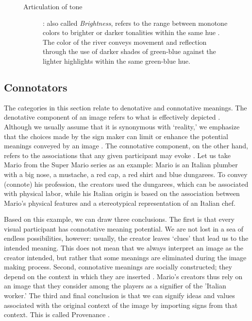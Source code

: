 \documentclass[english]{textolivre}
\begin{document}
\begin{figure}[htbp]
\begin{minipage}[t]{\textwidth}
\begin{description}
    \item[Articulation of tone]: also called \textit{Brightness}, refers to the range between monotone colors to brighter or darker tonalities within the same hue \cites[p. 167]{van_leeuwen_introducing_2005}. The color of the river conveys movement and reflection through the use of darker shades of green-blue against the lighter highlights within the same green-blue hue.
\end{description}
\end{minipage}
\end{figure}

\subsection{Connotators}\label{sec-modelo}
The categories in this section relate to denotative and connotative meanings. The denotative component of an image refers to what is effectively depicted \cite[p. 23]{ledin_introduction_2007}. Although we usually assume that it is synonymous with ‘reality,’ we emphasize that the choices made by the sign maker can limit or enhance the potential meanings conveyed by an image \textcite[p. 23]{ledin_introduction_2007}. The connotative component, on the other hand, refers to the associations that any given participant may evoke \cite[p. 219]{machin_how_2012}. Let us take Mario from the Super Mario series as an example: Mario is an Italian plumber with a big nose, a mustache, a red cap, a red shirt and blue dungarees. To convey (connote) his profession, the creators used the dungarees, which can be associated with physical labor, while his Italian origin is based on the association between Mario's physical features and a stereotypical representation of an Italian chef.

Based on this example, we can draw three conclusions. The first is that every visual participant has connotative meaning potential. We are not lost in a sea of endless possibilities, however: usually, the creator leaves ‘clues’ that lead us to the intended meaning. This does not mean that we always interpret an image as the creator intended, but rather that some meanings are eliminated during the image making process. Second, connotative meanings are socially constructed; they depend on the context in which they are inserted \cite[p. 219]{machin_how_2012}. Mario's creators thus rely on an image that they consider among the players as a signifier of the 'Italian worker.' The third and final conclusion is that we can signify ideas and values associated with the original context of the image by importing signs from that context. This is called Provenance \cite[p. 10]{kress_multimodal_2001}.
\end{document}
